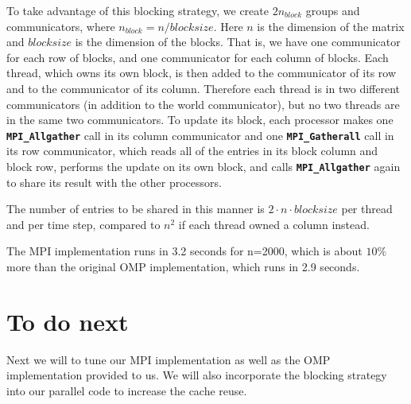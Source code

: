 \documentclass[11pt]{article}
\begin{document}
To take advantage of this blocking strategy, we create $2n_{block}$ groups and communicators, where $n_{block}=n/blocksize$. Here $n$  is the dimension of the matrix and $blocksize$ is the dimension of the blocks. That is, we have one communicator for each row of blocks, and one communicator for each column of blocks. Each thread, which owns its own block, is then added to the communicator of its row and to the communicator of its column. Therefore each thread is in two different communicators (in addition to the world communicator), but no two threads are in the same two communicators. To update its block, each processor makes one \textbf{\texttt{MPI\_Allgather}} call in its column communicator and one \textbf{ \texttt{MPI\_Gatherall} } call in its row communicator, which reads all of the entries in its block column and block row, performs the update on its own block, and calls \textbf{\texttt{MPI\_Allgather}} again to share its result with the other processors.

The number of entries to be shared in this manner is $2 \cdot n \cdot blocksize$ per thread and per time step, compared to $n^2$ if each thread owned a column instead.

The MPI implementation runs in 3.2 seconds for n=2000, which is about $10 \%$ more than the original OMP implementation, which runs in 2.9 seconds.
 
 
 
\section{To do next}
Next we will to tune our MPI implementation as well as the OMP implementation provided to us. We will also incorporate the blocking strategy into our parallel code to increase the cache reuse.
 
\end{document}

